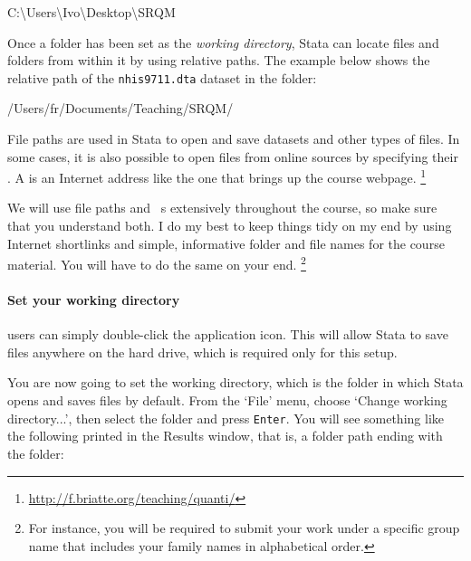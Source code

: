 	\begin{docspec}
		C:\textbackslash{}Users\textbackslash{}Ivo\textbackslash{}Desktop\textbackslash{}SRQM
	\end{docspec}
	
	Once a folder has been set as the \emph{working directory}, Stata can locate files and folders from within it by using relative paths. The example below shows the relative path of the \texttt{nhis9711.dta} dataset in the \texttt{\data} folder:\\[1em]%
	
	\begin{docspec}
		/Users/fr/Documents/Teaching/SRQM/
	\end{docspec}

	File paths are used in Stata to open and save datasets and other types of files. In some cases, it is also possible to open files from online sources by specifying their \URL. A \URL is an Internet address like the one that brings up the course webpage.%
		\footnote{\url{http://f.briatte.org/teaching/quanti/}}%
	
	We will use file paths and \URL\ s extensively throughout the course, so make sure that you understand both. I do my best to keep things tidy on my end by using Internet shortlinks and simple, informative folder and file names for the course material. You will have to do the same on your end.%
		\footnote{For instance, you will be required to submit your work under a specific group name that includes your family names in alphabetical order.}%

	\paragraph{Set your working directory}%
		\label{sec:working-directory}%

   \OSX users can simply double-click the application icon.  This will allow Stata to save files anywhere on the hard drive, which is required only for this setup.%
	 
	You are now going to set the working directory, which is the folder in which Stata opens and saves files by default. From the `File' menu, choose `Change working directory...', then select the \SRQM folder and press \texttt{Enter}. You will see something like the following printed in the Results window, that is, a folder path ending with the \SRQM folder:\\[1em]%
	
